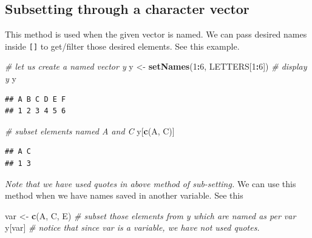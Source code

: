 \documentclass[
]{book}
\newenvironment{Shaded}{\begin{snugshade}}{\end{snugshade}}
\newcommand{\CommentTok}[1]{\textcolor[rgb]{0.56,0.35,0.01}{\textit{#1}}}
\newcommand{\DecValTok}[1]{\textcolor[rgb]{0.00,0.00,0.81}{#1}}
\newcommand{\FunctionTok}[1]{\textcolor[rgb]{0.13,0.29,0.53}{\textbf{#1}}}
\newcommand{\NormalTok}[1]{#1}
\newcommand{\OtherTok}[1]{\textcolor[rgb]{0.56,0.35,0.01}{#1}}
\newcommand{\SpecialCharTok}[1]{\textcolor[rgb]{0.81,0.36,0.00}{\textbf{#1}}}
\newcommand{\StringTok}[1]{\textcolor[rgb]{0.31,0.60,0.02}{#1}}
\begin{document}
\hypertarget{subsetting-through-a-character-vector}{%
\subsection{Subsetting through a character vector}\label{subsetting-through-a-character-vector}}

This method is used when the given vector is named. We can pass desired names inside \texttt{{[}{]}} to get/filter those desired elements. See this example.

\begin{Shaded}
\begin{Highlighting}[]
\CommentTok{\# let us create a named vector \textasciigrave{}y\textasciigrave{}}
\NormalTok{y }\OtherTok{\textless{}{-}} \FunctionTok{setNames}\NormalTok{(}\DecValTok{1}\SpecialCharTok{:}\DecValTok{6}\NormalTok{, LETTERS[}\DecValTok{1}\SpecialCharTok{:}\DecValTok{6}\NormalTok{])}
\CommentTok{\# display \textasciigrave{}y\textasciigrave{}}
\NormalTok{y}
\end{Highlighting}
\end{Shaded}

\begin{verbatim}
## A B C D E F 
## 1 2 3 4 5 6
\end{verbatim}

\begin{Shaded}
\begin{Highlighting}[]
\CommentTok{\# subset elements named \textasciigrave{}A\textasciigrave{} and \textasciigrave{}C\textasciigrave{}}
\NormalTok{y[}\FunctionTok{c}\NormalTok{(}\StringTok{\textquotesingle{}A\textquotesingle{}}\NormalTok{, }\StringTok{\textquotesingle{}C\textquotesingle{}}\NormalTok{)]}
\end{Highlighting}
\end{Shaded}

\begin{verbatim}
## A C 
## 1 3
\end{verbatim}

\emph{Note that we have used quotes in above method of sub-setting.} We can use this method when we have names saved in another variable. See this

\begin{Shaded}
\begin{Highlighting}[]
\NormalTok{var }\OtherTok{\textless{}{-}} \FunctionTok{c}\NormalTok{(}\StringTok{\textquotesingle{}A\textquotesingle{}}\NormalTok{, }\StringTok{\textquotesingle{}C\textquotesingle{}}\NormalTok{, }\StringTok{\textquotesingle{}E\textquotesingle{}}\NormalTok{)}
\CommentTok{\# subset those elements from \textasciigrave{}y\textasciigrave{} which are named as per \textasciigrave{}var\textasciigrave{}}
\NormalTok{y[var] }\CommentTok{\# notice that since \textasciigrave{}var\textasciigrave{} is a variable, we have not used quotes.}
\end{Highlighting}
\end{Shaded}
\end{document}
